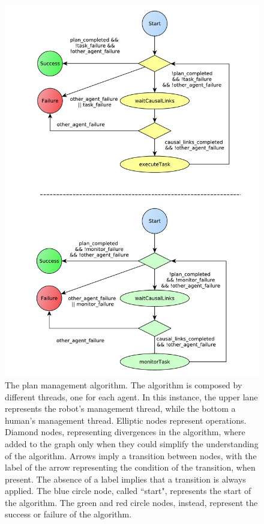 \begin{figure}[ht!]
 \centering
 \includegraphics[scale=0.6]{img/coworker/plan_management/manage_plan.pdf}
 \caption[Plan Management Algorithm]{The plan management algorithm. The algorithm is composed by different threads, one for each agent. In this instance, the upper lane represents the robot's management thread, while the bottom a human's management thread. Elliptic nodes represent operations. Diamond nodes, representing divergences in the algorithm, where added to the graph only when they could simplify the understanding of the algorithm. Arrows imply a transition between nodes, with the label of the arrow representing the condition of the transition, when present. The absence of a label implies that a transition is always applied. The blue circle node, called ``start", represents the start of the algorithm. The green and red circle nodes, instead, represent the success or failure of the algorithm.}
 \label{fig:plan_management-manage_plan}
 \end{figure}

